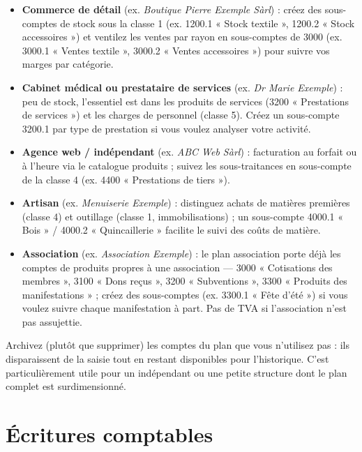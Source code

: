 \documentclass[a4paper,11pt,oneside]{article}
\begin{document}
\begin{itemize}
    \item \textbf{Commerce de détail} (ex. \emph{Boutique Pierre Exemple Sàrl}) : créez des sous-comptes de stock sous la classe 1 (ex. 1200.1 « Stock textile », 1200.2 « Stock accessoires ») et ventilez les ventes par rayon en sous-comptes de 3000 (ex. 3000.1 « Ventes textile », 3000.2 « Ventes accessoires ») pour suivre vos marges par catégorie.
    \item \textbf{Cabinet médical ou prestataire de services} (ex. \emph{Dr Marie Exemple}) : peu de stock, l'essentiel est dans les produits de services (3200 « Prestations de services ») et les charges de personnel (classe 5). Créez un sous-compte 3200.1 par type de prestation si vous voulez analyser votre activité.
    \item \textbf{Agence web / indépendant} (ex. \emph{ABC Web Sàrl}) : facturation au forfait ou à l'heure via le catalogue produits ; suivez les sous-traitances en sous-compte de la classe 4 (ex. 4400 « Prestations de tiers »).
    \item \textbf{Artisan} (ex. \emph{Menuiserie Exemple}) : distinguez achats de matières premières (classe 4) et outillage (classe 1, immobilisations) ; un sous-compte 4000.1 « Bois » / 4000.2 « Quincaillerie » facilite le suivi des coûts de matière.
    \item \textbf{Association} (ex. \emph{Association Exemple}) : le plan association porte déjà les comptes de produits propres à une association --- 3000 « Cotisations des membres », 3100 « Dons reçus », 3200 « Subventions », 3300 « Produits des manifestations » ; créez des sous-comptes (ex. 3300.1 « Fête d'été ») si vous voulez suivre chaque manifestation à part. Pas de TVA si l'association n'est pas assujettie.
\end{itemize}

\begin{keshtip}
Archivez (plutôt que supprimer) les comptes du plan que vous n'utilisez pas : ils disparaissent de la saisie tout en restant disponibles pour l'historique. C'est particulièrement utile pour un indépendant ou une petite structure dont le plan complet est surdimensionné.
\end{keshtip}

\section{Écritures comptables}
\end{document}

